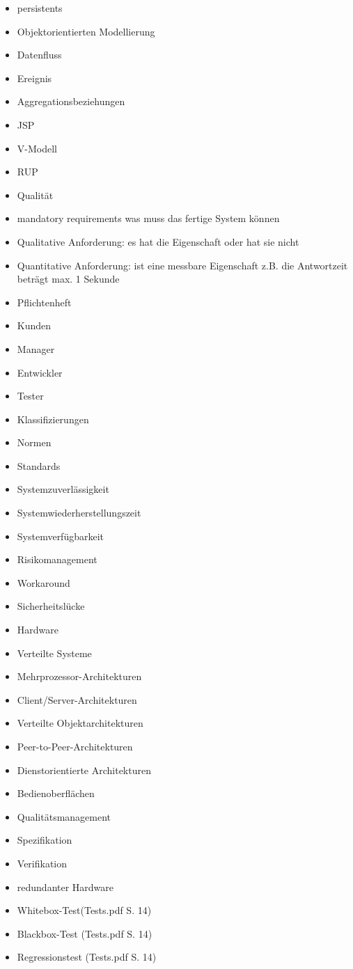 \begin{itemize}
\item persistents
\item Objektorientierten Modellierung
\item Datenfluss
\item Ereignis
\item Aggregationsbeziehungen
\item JSP
\item V-Modell
\item RUP
\item Qualität
\item mandatory requirements was muss das fertige System können
\item Qualitative Anforderung: es hat die Eigenschaft oder hat sie nicht
\item Quantitative Anforderung: ist eine messbare Eigenschaft z.B. die Antwortzeit beträgt max. 1 Sekunde
\item Pflichtenheft
\item Kunden
\item Manager
\item Entwickler
\item Tester
\item Klassifizierungen
\item Normen
\item Standards
\item Systemzuverlässigkeit
\item Systemwiederherstellungszeit
\item Systemverfügbarkeit
\item Risikomanagement
\item Workaround
\item Sicherheitslücke
\item Hardware
\item Verteilte Systeme
\item Mehrprozessor-Architekturen
\item Client/Server-Architekturen
\item Verteilte Objektarchitekturen
\item Peer-to-Peer-Architekturen
\item Dienstorientierte Architekturen
\item Bedienoberflächen
\item Qualitätsmanagement
\item Spezifikation
\item Verifikation
\item redundanter Hardware
\item Whitebox-Test(Tests.pdf S. 14)
\item Blackbox-Test (Tests.pdf S. 14)
\item Regressionstest (Tests.pdf S. 14)
\end{itemize}